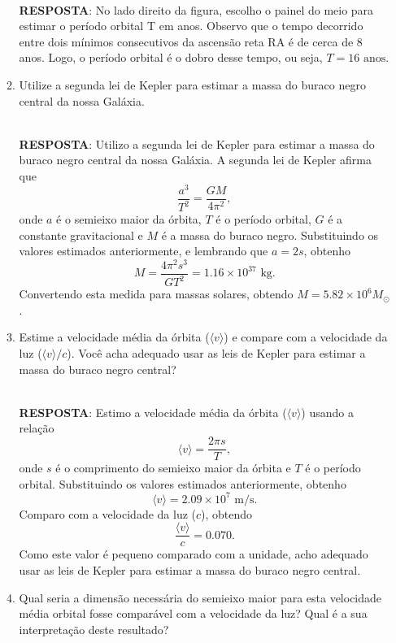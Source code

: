 \documentclass[a4paper,12pt]{article}
\begin{document}
\begin{enumerate}
\begin{enumerate}
\noindent\hrulefill\\\textbf{RESPOSTA}: No lado direito da figura, escolho o painel do meio para estimar o período orbital T em anos. Observo que o tempo decorrido entre dois mínimos consecutivos da ascensão reta RA é de cerca de 8 anos. Logo, o período orbital é o dobro desse tempo, ou seja, $T = 16 \text{ anos}$.

\noindent\hrulefill

\item Utilize a segunda lei de Kepler para estimar a massa do buraco negro central da nossa Galáxia. 

\noindent\hrulefill\\\textbf{RESPOSTA}: Utilizo a segunda lei de Kepler para estimar a massa do buraco negro central da nossa Galáxia. A segunda lei de Kepler afirma que $$\frac{a^3}{T^2} = \frac{GM}{4\pi^2},$$ onde $a$ é o semieixo maior da órbita, $T$ é o período orbital, $G$ é a constante gravitacional e $M$ é a massa do buraco negro. Substituindo os valores estimados anteriormente, e lembrando que $a = 2s$, obtenho $$M = \frac{4\pi^2s^3}{GT^2} = 1.16 \times 10^{37} \text{ kg}.$$ Convertendo esta medida para massas solares, obtendo $M = 5.82 \times 10^6 M_\odot$.

\noindent\hrulefill

\item Estime a velocidade média da órbita ($\langle v \rangle$) e compare com a velocidade da luz ($\langle v \rangle/c$). Você acha adequado usar as leis de Kepler para estimar a massa do buraco negro central? 

\noindent\hrulefill\\\textbf{RESPOSTA}: Estimo a velocidade média da órbita ($\langle v \rangle$) usando a relação $$\langle v \rangle = \frac{2\pi s}{T},$$ onde $s$ é o comprimento do semieixo maior da órbita e $T$ é o período orbital. Substituindo os valores estimados anteriormente, obtenho $$\langle v \rangle = 2.09 \times 10^7 \text{ m/s}.$$ Comparo com a velocidade da luz ($c$), obtendo $$\frac{\langle v \rangle}{c} = 0.070.$$ Como este valor é pequeno comparado com a unidade, acho adequado usar as leis de Kepler para estimar a massa do buraco negro central.

\noindent\hrulefill

\item Qual seria a dimensão necessária do semieixo maior para esta velocidade média orbital fosse comparável com a velocidade da luz? Qual é a sua interpretação deste resultado?


\end{enumerate}
\end{enumerate}
\end{document}
